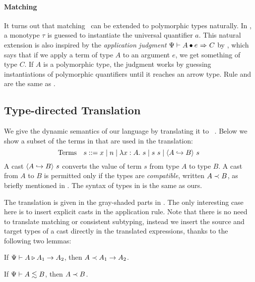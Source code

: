 \paragraph{Matching} It turns out that matching~\cite{siek2015refined} can be
extended to polymorphic types naturally. In , a monotype $\tau$ is
guessed to instantiate the universal quantifier $a$. This natural extension is
also inspired by the \textit{application judgment} $\Psi {} \vdash A \bullet e {~\Rightarrow~}
C$ by \citet{dunfield2013complete}, which says that if we apply a term of type
$A$ to an argument $e$, we get something of type $C$. If $A$ is a polymorphic
type, the judgment works by guessing instantiations of polymorphic quantifiers
until it reaches an arrow type. Rule  and  are the
same as \citet{siek2015refined}.


\renewcommand{\trto}[1]{\rightsquigarrow{#1}}
\subsection{Type-directed Translation}
\label{sec:type:trans}

We give the dynamic semantics of our language by translating it to
\pbc~\cite{ahmed2011blame}. Below we show a subset of the terms in \pbc that are
used in the translation:
\[
  \text{Terms}\quad s ::= x \mid n \mid \lambda x:A.~ s \mid s~s \mid \langle A \hookrightarrow B \rangle ~ s
\]
A cast $\langle A \hookrightarrow B \rangle ~ {s}$ converts the value of term $s$ from type $A$ to type $B$.
A cast from $A$ to $B$ is permitted only if the types are \textit{compatible},
written $A \prec B$, as briefly mentioned in
. The syntax of types in \pbc is the
same as ours.

The translation is given in the gray-shaded parts in . The
only interesting case here is to insert explicit casts in the application rule.
Note that there is no need to translate matching or consistent subtyping,
instead we insert the source and target types of a cast directly in the
translated expressions, thanks to the following two lemmas:

\begin{clemma}
  \label{lemma:comp-match}
  If $\Psi {} \vdash A \triangleright A_1 \to A_2$, then $A \prec A_1 \to A_2$.
\end{clemma}

\begin{clemma}
  \label{lemma:comp-conssub}
  If $\Psi {} \vdash A \lesssim B$, then $A \prec B$.
\end{clemma}

